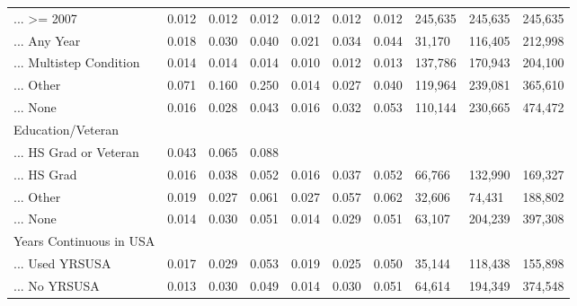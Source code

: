\documentclass[
  letterpaper,
  DIV=11,
  numbers=noendperiod]{scrartcl}
\begin{document}
\begin{table}[!htbp]
{\begin{tabular}{llllllllll}
... >= 2007 & 0.012 & 0.012 & 0.012 & 0.012 & 0.012 & 0.012 & 245,635 & 245,635 & 245,635 \\ 
... Any Year & 0.018 & 0.030 & 0.040 & 0.021 & 0.034 & 0.044 & 31,170 & 116,405 & 212,998 \\ 
... Multistep Condition & 0.014 & 0.014 & 0.014 & 0.010 & 0.012 & 0.013 & 137,786 & 170,943 & 204,100 \\ 
... Other & 0.071 & 0.160 & 0.250 & 0.014 & 0.027 & 0.040 & 119,964 & 239,081 & 365,610 \\ 
... None & 0.016 & 0.028 & 0.043 & 0.016 & 0.032 & 0.053 & 110,144 & 230,665 & 474,472 \\ 
Education/Veteran &  &  &  &  &  &  &  &  &  \\ 
... HS Grad or Veteran & 0.043 & 0.065 & 0.088 &  &  &  &  &  &  \\ 
... HS Grad & 0.016 & 0.038 & 0.052 & 0.016 & 0.037 & 0.052 & 66,766 & 132,990 & 169,327 \\ 
... Other & 0.019 & 0.027 & 0.061 & 0.027 & 0.057 & 0.062 & 32,606 & 74,431 & 188,802 \\ 
... None & 0.014 & 0.030 & 0.051 & 0.014 & 0.029 & 0.051 & 63,107 & 204,239 & 397,308 \\ 
Years Continuous in USA &  &  &  &  &  &  &  &  &  \\ 
... Used YRSUSA & 0.017 & 0.029 & 0.053 & 0.019 & 0.025 & 0.050 & 35,144 & 118,438 & 155,898 \\ 
... No YRSUSA & 0.013 & 0.030 & 0.049 & 0.014 & 0.030 & 0.051 & 64,614 & 194,349 & 374,548\\ 
\hline
\hline
\end{tabular}
}
\end{table}
\end{document}
